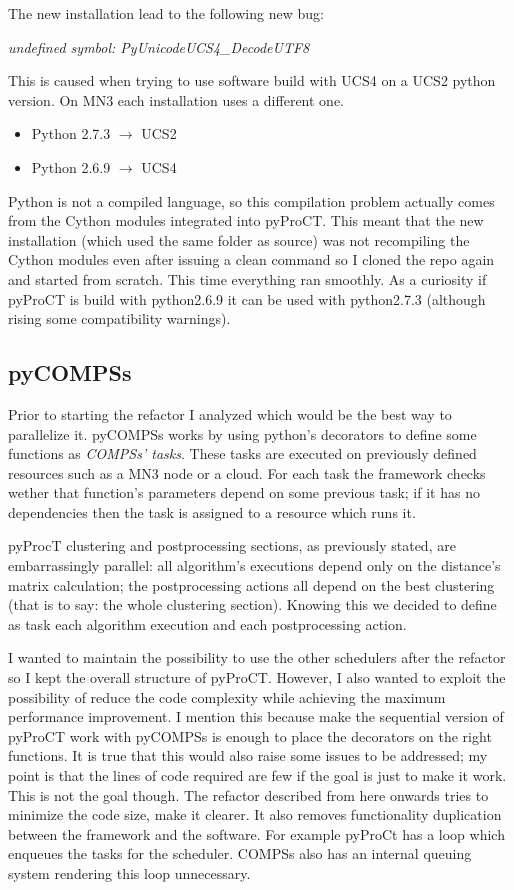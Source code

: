 The new installation lead to the following new bug: 

\textit{undefined symbol: PyUnicodeUCS4\_DecodeUTF8}

This is caused when trying to use software build with UCS4 on a UCS2 python version. On MN3 each installation uses a different one.

\begin{itemize}
\itemsep0em 
\item Python 2.7.3 $\rightarrow$ UCS2
\item Python 2.6.9 $\rightarrow$ UCS4
\end{itemize}

Python is not a compiled language, so this compilation problem actually comes from the Cython modules integrated into pyProCT. This meant that the new installation (which used the same folder as source) was not recompiling the Cython modules even after issuing a clean command so I cloned the repo again and started from scratch. This time everything ran smoothly. As a curiosity if pyProCT is build with python2.6.9 it can be used with python2.7.3 (although rising some compatibility warnings).

\subsection{pyCOMPSs}
\label{subsec:pycompss}

Prior to starting the refactor I analyzed which would be the best way to parallelize it. pyCOMPSs works by using python's decorators to define some functions as \textit{COMPSs' tasks}. These tasks are executed on previously defined resources such as a MN3 node or a cloud. For each task the framework checks wether that function's parameters depend on some previous task; if it has no dependencies then the task is assigned to a resource which runs it. 

pyProcT clustering and postprocessing sections, as previously stated, are embarrassingly parallel: all algorithm's executions depend only on the distance's matrix calculation; the postprocessing actions all depend on the best clustering (that is to say: the whole clustering section). Knowing this we decided to define as task each algorithm execution and each postprocessing action.

I wanted to maintain the possibility to use the other schedulers after the refactor so I kept the overall structure of pyProCT. However, I also wanted to exploit the possibility of reduce the code complexity while achieving the maximum performance improvement. I mention this because make the sequential version of pyProCT work with pyCOMPSs is enough to place the decorators on the right functions. It is true that this would also raise some issues to be addressed; my point is that the lines of code required are few if the goal is just to make it work. This is not the goal though. The refactor described from here onwards tries to minimize the code size, make it clearer. It also removes functionality duplication between the framework and the software. For example pyProCt has a loop which enqueues the tasks for the scheduler. COMPSs also has an internal queuing system rendering this loop unnecessary.

